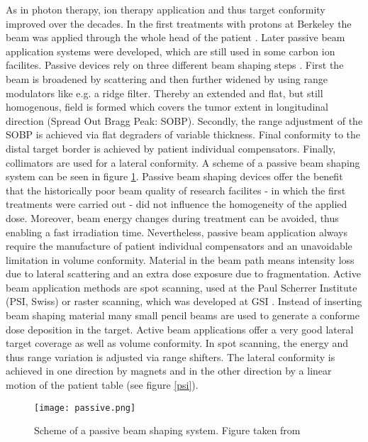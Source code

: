 \documentclass[type=dr, dr=rernat, accentcolor=tud7b,colorbacktitle, bigchapter, openright, twoside, 12pt ]{tudthesis}
\begin{document}
As in photon therapy, ion therapy application and thus target conformity improved over the decades. In the first treatments with protons at 
Berkeley the beam was applied through the whole head of the patient \cite{Tob58}.\newline
\newline
Later passive beam application systems were developed, which are still used in some carbon ion facilites. 
Passive devices rely on three different beam shaping steps \cite{Chu93}. 
First the beam is broadened by scattering and then further widened by using range modulators like e.g. a 
ridge filter. Thereby an extended and flat, but still homogenous, field is formed which covers the tumor extent in longitudinal direction 
(Spread Out Bragg Peak: SOBP). Secondly, the range adjustment of the SOBP is achieved via flat degraders of variable thickness. Final 
conformity to the distal target border is achieved by patient individual compensators. Finally, collimators are used for a lateral 
conformity. A scheme of a passive beam shaping system can be seen in figure \ref{passive}. 
Passive beam shaping devices offer the benefit that the historically poor beam 
quality of research facilites - in which the first treatments were carried out - did not influence the homogeneity of the applied dose. 
Moreover, beam energy changes during treatment can be avoided, thus enabling a fast irradiation time. Nevertheless, passive beam 
application always require the manufacture of patient individual compensators and an unavoidable limitation in volume conformity. 
Material in the beam path means intensity loss due to lateral scattering and an extra dose exposure due to fragmentation.\newline
\newline
Active beam application methods are spot scanning, used at the Paul Scherrer Institute (PSI, Swiss) \cite{Ped95} or raster scanning, which 
was developed at GSI \cite{Hab93}. Instead of inserting beam shaping material many small pencil beams are used to generate a conforme dose 
deposition in the target. Active beam applications offer a very good lateral target coverage as well as volume conformity. 
In spot scanning, the energy and thus range variation is adjusted via range shifters. The lateral conformity is 
achieved in one direction by magnets and in the other direction by a linear motion of the patient table (see figure \ref{psi}). 

\begin{figure}[H]
\begin{center}
\texttt{[image: passive.png]}
\caption{Scheme of a passive beam shaping system. Figure taken from \cite{Reg02}}
\label{passive}
\end{center}
\end{figure}
\end{document}
